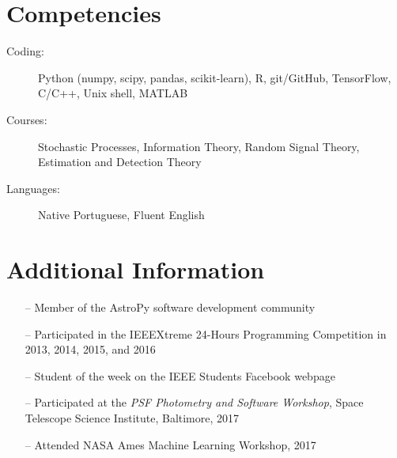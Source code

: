 \documentclass[10pt]{article}
\begin{document}
\begin{titlepage}
\section*{Competencies}
\begin{description}
    \item[Coding:] Python (numpy, scipy, pandas, scikit-learn), R, git/GitHub, TensorFlow, C/C++, Unix shell, MATLAB
    \item[Courses:] Stochastic Processes, Information Theory, Random Signal Theory, Estimation and Detection Theory
    \item[Languages:] Native Portuguese, Fluent English
\end{description}

\section*{Additional Information}
\begin{itemize}
    \item[--] Member of the AstroPy software development community
    \item[--] Participated in the IEEEXtreme 24-Hours Programming Competition in 2013, 2014, 2015, and 2016
    \item[--] Student of the week on the IEEE Students Facebook webpage
    \item[--] Participated at the \textit{PSF Photometry and Software Workshop}, Space Telescope Science Institute, Baltimore, 2017
    \item[--] Attended NASA Ames Machine Learning Workshop, 2017
\end{itemize}

\end{titlepage}
\end{document}
